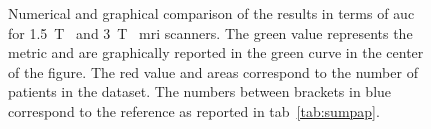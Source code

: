 \begin{figure}
{
 }
  \caption[Results comparison from the state-of-the-art in terms of \acs*{auc}.]{Numerical and graphical comparison of the results in terms of \acs*{auc} for \SI{1.5}{\tesla}~ and \SI{3}{\tesla}~ \acs*{mri} scanners. The {\color{semiAuto}green} value represents the metric and are graphically reported in the {\color{semiAuto}green} curve in the center of the figure. The {\color{red}red} value and areas correspond to the number of patients in the dataset. The numbers between brackets in {blue\color{blue}} correspond to the reference as reported in \acs{tab}~\ref{tab:sumpap}.}
  \label{fig:auc}
\end{figure}
